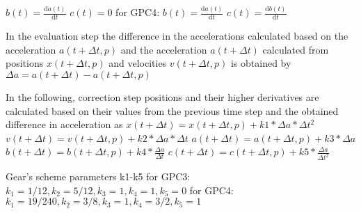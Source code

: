$b(t) = \frac{\mathrm d a(t)}{\mathrm d t}$
$c(t) = 0$
for GPC4:
$b(t) = \frac{\mathrm d a(t)}{\mathrm d t}$
$c(t) = \frac{\mathrm d b(t)}{\mathrm d t}$
\par
In the evaluation step the difference in the accelerations calculated based on the acceleration
$a(t+ \Delta t, p)$ and the acceleration $a(t+\Delta t)$ calculated from positions $x(t+\Delta t,
p)$ and velocities $v(t+\Delta t, p)$ is obtained by
$\Delta a = a(t+\Delta t) − a(t+\Delta t, p)$
\par
In the following, correction step positions and their higher derivatives are calculated based on
their values from the previous time step and the obtained difference in acceleration as
$x(t+\Delta t) = x(t+\Delta t, p) + k1 * \Delta a * \Delta t^2$
$v(t+\Delta t) = v(t+\Delta t, p) + k2 * \Delta a * \Delta t$
$a(t+\Delta t) = a(t+\Delta t, p) + k3 * \Delta a$
$b(t+\Delta t) = b(t+\Delta t, p) + k4 * \frac{\Delta a}{\Delta t}$
$c(t+\Delta t) = c(t+\Delta t, p) + k5 * \frac{\Delta a}{\Delta t^2}$
\par
Gear’s scheme parameters k1-k5
for GPC3:
$k_1 = 1/12, k_2 = 5/12, k_3 = 1, k_4 = 1, k_5 = 0$
for GPC4:
$k_1 = 19/240, k_2 = 3/8, k_3 = 1, k_4 = 3/2, k_5 = 1$
\par
\newpage